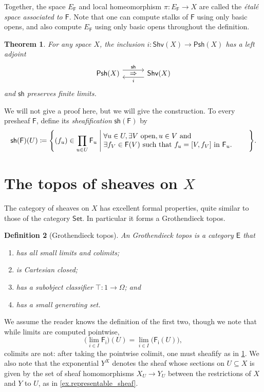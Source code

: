 \documentclass[reqno,11pt]{amsproc}
\newcommand{\adj}[5][30pt]{%
\begin{tikzcd}[ampersand replacement=\&, column sep=#1]
  #2\ar[r, shift left=5pt, "{#3}"]\ar[r, phantom, "\Rightarrow" yshift=-.4pt]\&
  #5\ar[l, shift left=5pt, "{#4}"]
\end{tikzcd}
}
\theoremstyle{plain}
\newtheorem{theorem}{Theorem}[section]
\newtheorem{definition}[theorem]{Definition}
\theoremstyle{definition}
\newcommand{\cat}[1]{\mathsf{#1}}
\newcommand{\fun}[1]{\mathsf{#1}}
\newcommand{\sheaf}[1]{\fun{#1}}
\newcommand{\Set}{\cat{Set}}
\renewcommand{\to}[1][]{\xrightarrow{#1}}
\newcommand{\tn}[1]{\textnormal{#1}}
\newcommand{\psh}{\cat{Psh}}
\newcommand{\shv}{\cat{Shv}}
\let\originalleft\left
\let\originalright\right
\renewcommand{\left}{\mathopen{}\mathclose\bgroup\originalleft}
\renewcommand{\right}{\aftergroup\egroup\originalright}
\numberwithin{equation}{section}
\begin{document}
Together, the space $E_\sheaf{F}$ and local homeomorphism $\pi\colon E_\sheaf{F}\to X$ are called the \emph{\'etal\'e space associated to $\sheaf{F}$}. Note that one can compute stalks of $\sheaf{F}$ using only basic opens, and also compute $E_\sheaf{F}$ using only basic opens throughout the definition.

\begin{theorem}\label{thm.sheafify}
For any space $X$, the inclusion $i\colon\shv(X)\to\psh(X)$ has a left adjoint
\[
\adj{\psh(X)}{\fun{sh}}{i}{\shv(X)}
\]
and $\fun{sh}$ preserves finite limits.
\end{theorem}
We will not give a proof here, but we will give the construction. To every presheaf $\sheaf{F}$, define its \emph{sheafification} $\fun{sh}(\sheaf{F})$ by
\[
	\fun{sh}(\sheaf{F})(U)
	\coloneqq
	\left\{(f_u)\in\prod_{u\in U}\sheaf{F}_u\;\middle|\;
	\parbox{2.8in}{$\forall u\in U,\exists V\tn{ open}, u\in V\tn{ and }\\\exists f_V\in\sheaf{F}(V)
\tn{ such that } f_u=[V, f_V]\tn { in }\sheaf{F}_u.$}
\right\}.
\]


\section{The topos of sheaves on $X$}

The category of sheaves on $X$ has excellent formal properties, quite similar to those of the category $\Set$. In particular it forms a Grothendieck topos. 

\begin{definition}[Grothendieck topos]\label{def.Grothendieck_topos}
An \emph{Grothendieck topos} is a category $\cat{E}$ that 
\begin{enumerate}
	\item has all small limits and colimits;
	\item is Cartesian closed;
	\item has a subobject classifier $\top\colon 1\to\Omega$; and
	\item has a small generating set.
\end{enumerate}
\end{definition}
We assume the reader knows the definition of the first two, though we note that while limits are computed pointwise,
\[\Big(\lim_{i\in I}\sheaf{F_i}\Big)(U)=\lim_{i\in I}\big(\sheaf{F_i}(U)\big),\]
colimits are not: after taking the pointwise colimit, one must sheafify as in \cref{thm.sheafify}. We also note that the exponential $Y^X$ denotes the sheaf whose sections on $U\subseteq X$ is given by the set of sheaf homomorphisms $X_U\to Y_U$ between the restrictions of $X$ and $Y$ to $U$, as in \cref{ex.representable_sheaf}.
\end{document}
